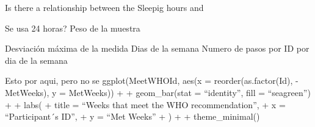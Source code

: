 \documentclass[
]{article}
\begin{document}
Is there a relationship between the Sleepig hours and

Se usa 24 horas? Peso de la muestra

Desviación máxima de la medida Dias de la semana Numero de pasos por ID
por dia de la semana

Esto por aqui, pero no se ggplot(MeetWHOId, aes(x =
reorder(as.factor(Id), -MetWeeks), y = MetWeeks)) + + geom\_bar(stat =
``identity'', fill = ``seagreen'') + + labs( + title = ``Weeks that meet
the WHO recommendation'', + x = ``Participant´s ID'', + y = ``Met
Weeks'' + ) + + theme\_minimal()
\end{document}
